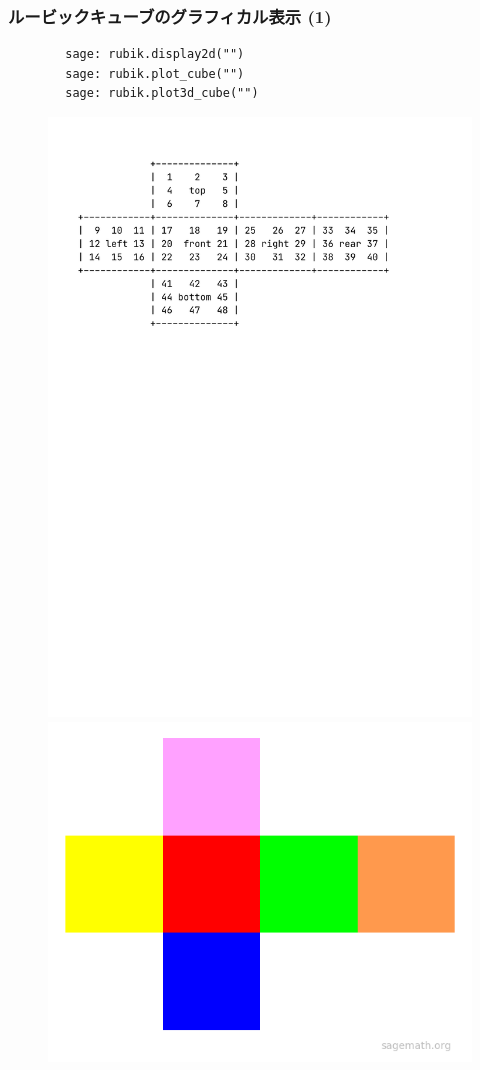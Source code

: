 \documentclass{beamer}
\begin{document}
\begin{frame}[fragile=singleslide]
    \frametitle{ルービックキューブのグラフィカル表示 (1)}

    \begin{verbatim}
        sage: rubik.display2d("")
        sage: rubik.plot_cube("")
        sage: rubik.plot3d_cube("")
    \end{verbatim}

    \begin{figure}
        \includegraphics[scale=0.28]{images/display2d.pdf}
        \includegraphics[scale=0.25]{images/plot_cube.png}

\end{figure}
\end{frame}
\end{document}
